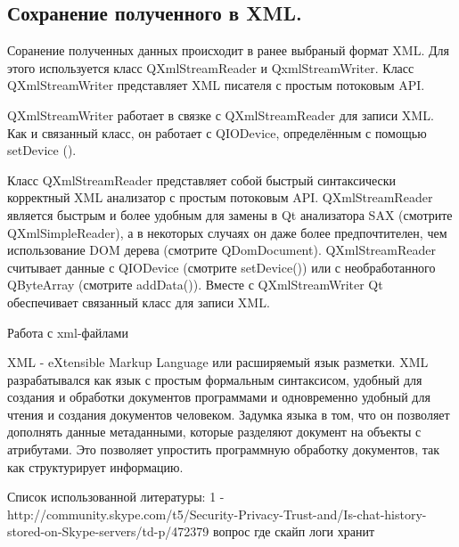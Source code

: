 \subsection{Сохранение полученного в XML.}

Соранение полученных данных происходит в ранее выбраный формат XML. Для этого используется класс QXmlStreamReader и QxmlStreamWriter.
Класс QXmlStreamWriter представляет XML писателя с простым потоковым API.

QXmlStreamWriter работает в связке с QXmlStreamReader для записи XML. Как и связанный класс, он работает с QIODevice, определённым с помощью setDevice ().


Класс QXmlStreamReader представляет собой быстрый синтаксически корректный XML анализатор с простым потоковым API.
QXmlStreamReader является быстрым и более удобным для замены в Qt анализатора SAX (смотрите QXmlSimpleReader), а в некоторых случаях он даже более предпочтителен, чем использование DOM дерева (смотрите QDomDocument). QXmlStreamReader считывает данные с QIODevice (смотрите setDevice()) или с необработанного QByteArray (смотрите addData()). Вместе с QXmlStreamWriter Qt обеспечивает связанный класс для записи XML.

Работа с xml-файлами 

XML - eXtensible Markup Language или расширяемый язык разметки. XML разрабатывался как язык с простым формальным синтаксисом, удобный для создания и обработки документов программами и одновременно удобный для чтения и создания документов человеком. Задумка языка в том, что он позволяет дополнять данные метаданными, которые разделяют документ на объекты с атрибутами. Это позволяет упростить программную обработку документов, так как структурирует информацию. 

Список использованной литературы:
1 -  http://community.skype.com/t5/Security-Privacy-Trust-and/Is-chat-history-stored-on-Skype-servers/td-p/472379 вопрос где скайп логи хранит
